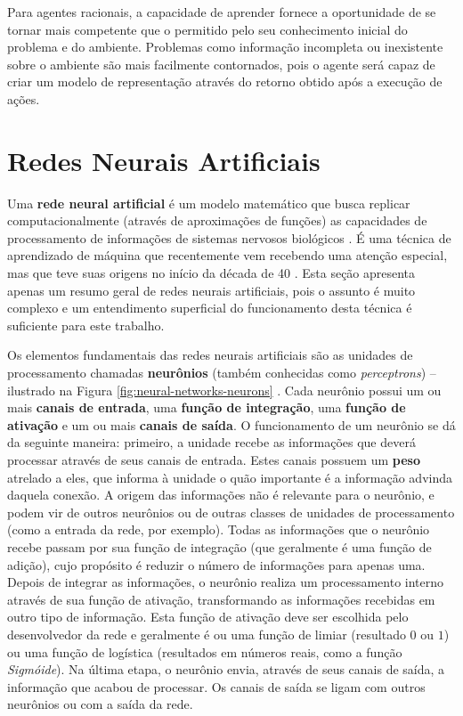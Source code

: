 Para agentes racionais, a capacidade de aprender fornece a oportunidade de se
tornar mais competente que o permitido pelo seu conhecimento inicial do problema
e do ambiente. Problemas como informação incompleta ou inexistente sobre o
ambiente são mais facilmente contornados, pois o agente será capaz de criar um
modelo de representação através do retorno obtido após a execução de ações.


\section{\label{section:neural-networks}Redes Neurais Artificiais}
Uma \textbf{rede neural artificial} é um modelo matemático que busca replicar
computacionalmente (através de aproximações de funções) as capacidades de
processamento de informações de sistemas nervosos biológicos \cite[Cap.
1]{Rojas:1996:NNS:235222}. É uma técnica de aprendizado de máquina que
recentemente vem recebendo uma atenção especial, mas que teve suas origens no
início da década de 40 \cite[Cap. 18]{RussellNorvig200912}. Esta seção apresenta
apenas um resumo geral de redes neurais artificiais, pois o assunto é muito
complexo e um entendimento superficial do funcionamento desta técnica é
suficiente para este trabalho.

Os elementos fundamentais das redes neurais artificiais são as unidades de
processamento chamadas \textbf{neurônios} (também conhecidas como
\textit{perceptrons}) -- ilustrado na Figura \ref{fig:neural-networks-neurons}
\cite[Cap. 3]{Rojas:1996:NNS:235222}.  Cada neurônio possui um ou mais
\textbf{canais de entrada}, uma \textbf{função de integração}, uma
\textbf{função de ativação} e um ou mais \textbf{canais de saída}. O
funcionamento de um neurônio se dá da seguinte maneira: primeiro, a unidade
recebe as informações que deverá processar através de seus canais de entrada.
Estes canais possuem um \textbf{peso} atrelado a eles, que informa à unidade o
quão importante é a informação advinda daquela conexão. A origem das informações
não é relevante para o neurônio, e podem vir de outros neurônios ou de outras
classes de unidades de processamento (como a entrada da rede, por exemplo).
Todas as informações que o neurônio recebe passam por sua função de integração
(que geralmente é uma função de adição), cujo propósito é reduzir o número de
informações para apenas uma.  Depois de integrar as informações, o neurônio
realiza um processamento interno através de sua função de ativação,
transformando as informações recebidas em outro tipo de informação. Esta função
de ativação deve ser escolhida pelo desenvolvedor da rede e geralmente é ou uma
função de limiar (resultado $0$ ou $1$) ou uma função de logística (resultados
em números reais, como a função \textit{Sigmóide}). Na última etapa, o neurônio
envia, através de seus canais de saída, a informação que acabou de processar. Os
canais de saída se ligam com outros neurônios ou com a saída da rede.

